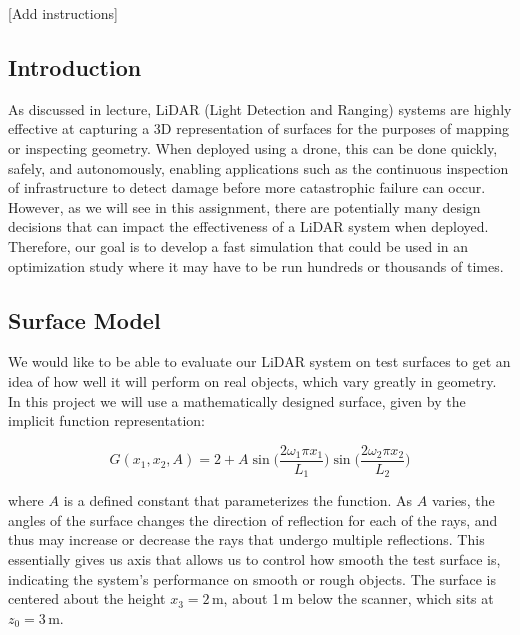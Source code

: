 \documentclass[../../me144_244_student.tex]{subfiles}
\begin{document}
\pagestyle{mypagestyle}
[Add instructions]

\subsection*{Introduction}

As discussed in lecture, LiDAR (Light Detection and Ranging) systems are highly
effective at capturing a 3D representation of surfaces for the purposes of mapping or inspecting
geometry. When deployed using a drone, this can be done quickly, safely, and autonomously,
enabling applications such as the continuous inspection of infrastructure to detect damage
before more catastrophic failure can occur. However, as we will see in this assignment, there are
potentially many design decisions that can impact the effectiveness of a LiDAR system when deployed.
Therefore, our goal is to develop a fast simulation that could be used in an optimization
study where it may have to be run hundreds or thousands of times.

\subsection*{Surface Model}

We would like to be able to evaluate our LiDAR system on test surfaces to get an
idea of how well it will perform on real objects, which vary greatly in geometry. In this project
we will use a mathematically designed surface, given by the implicit function representation:

\vspace{0.1 in}
\begin{equation}\label{surfG}
    G(x_1, x_2, A) = 2 + A \sin\bigg(\frac{2 \omega_1 \pi x_1}{L_1}\bigg) \sin\bigg(\frac{2 \omega_2 \pi x_2}{L_2}\bigg)
\end{equation}
\vspace{0.1 in}

where $A$ is a defined constant that parameterizes the function. As $A$ varies, the angles of the
surface changes the direction of reflection for each of the rays, and thus may increase or decrease
the rays that undergo multiple reflections. This essentially gives us axis that allows us to control
how smooth the test surface is, indicating the system's performance on smooth or rough objects.
The surface is centered about the height $x_3 = 2$\,m, about 1\,m below the scanner, which sits at
$z_0 = 3$\,m.
\end{document}
